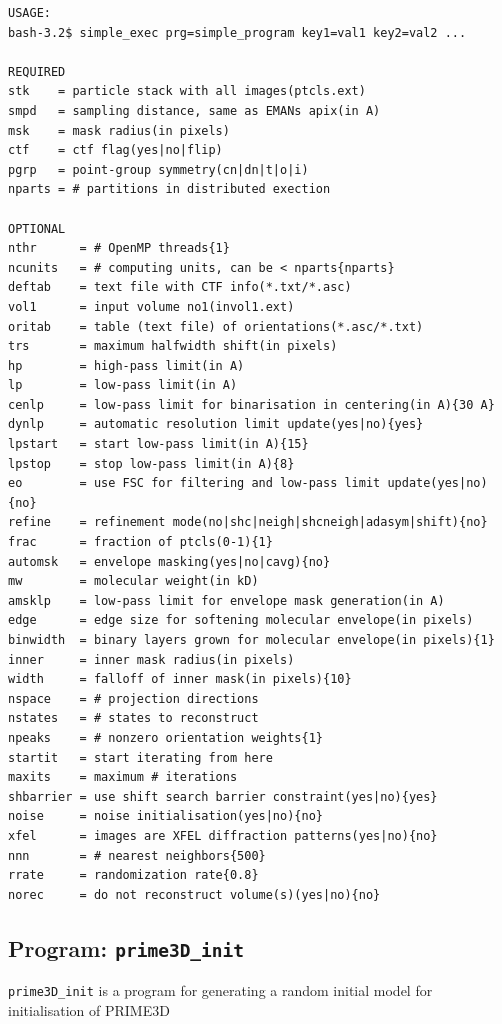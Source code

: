 \documentclass[a4paper,11pt]{article}
\newcommand{\prgname}[1]{\textcolor{NavyBlue}{\texttt{#1}}}
\begin{document}
\begin{verbatim}
USAGE:
bash-3.2$ simple_exec prg=simple_program key1=val1 key2=val2 ...

REQUIRED
stk    = particle stack with all images(ptcls.ext)
smpd   = sampling distance, same as EMANs apix(in A)
msk    = mask radius(in pixels)
ctf    = ctf flag(yes|no|flip)
pgrp   = point-group symmetry(cn|dn|t|o|i)
nparts = # partitions in distributed exection

OPTIONAL
nthr      = # OpenMP threads{1}
ncunits   = # computing units, can be < nparts{nparts}
deftab    = text file with CTF info(*.txt/*.asc)
vol1      = input volume no1(invol1.ext)
oritab    = table (text file) of orientations(*.asc/*.txt)
trs       = maximum halfwidth shift(in pixels)
hp        = high-pass limit(in A)
lp        = low-pass limit(in A)
cenlp     = low-pass limit for binarisation in centering(in A){30 A}
dynlp     = automatic resolution limit update(yes|no){yes}
lpstart   = start low-pass limit(in A){15}
lpstop    = stop low-pass limit(in A){8}
eo        = use FSC for filtering and low-pass limit update(yes|no){no}
refine    = refinement mode(no|shc|neigh|shcneigh|adasym|shift){no}
frac      = fraction of ptcls(0-1){1}
automsk   = envelope masking(yes|no|cavg){no}
mw        = molecular weight(in kD)
amsklp    = low-pass limit for envelope mask generation(in A)
edge      = edge size for softening molecular envelope(in pixels)
binwidth  = binary layers grown for molecular envelope(in pixels){1}
inner     = inner mask radius(in pixels)
width     = falloff of inner mask(in pixels){10}
nspace    = # projection directions
nstates   = # states to reconstruct
npeaks    = # nonzero orientation weights{1}
startit   = start iterating from here
maxits    = maximum # iterations
shbarrier = use shift search barrier constraint(yes|no){yes}
noise     = noise initialisation(yes|no){no}
xfel      = images are XFEL diffraction patterns(yes|no){no}
nnn       = # nearest neighbors{500}
rrate     = randomization rate{0.8}
norec     = do not reconstruct volume(s)(yes|no){no}
\end{verbatim}

\subsection{Program: \prgname{prime3D\_init}}
\label{prime3D_init}
\prgname{prime3D\_init} is a program for generating a random initial model for initialisation of PRIME3D 
\end{document}
